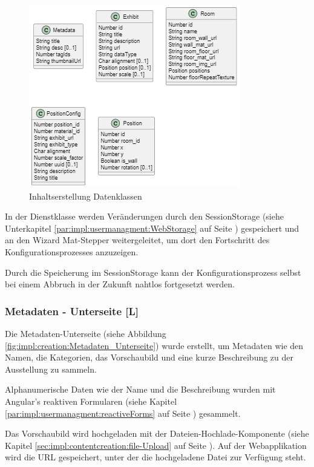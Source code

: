 \begin{figure}
    \centering
    \includegraphics[scale=0.7]{pics/content_creation_classes.png}
    \caption{Inhaltserstellung Datenklassen}
    \label{fig:impl:creation:dataclasses}
\end{figure}

In der Dienstklasse werden Veränderungen durch den SessionStorage (siehe Unterkapitel \ref{par:impl:usermanagment:WebStorage} auf Seite \pageref{par:impl:usermanagment:WebStorage}) gespeichert und an den Wizard Mat-Stepper weitergeleitet, um dort den Fortschritt des Konfigurationsprozesses anzuzeigen.

Durch die Speicherung im SessionStorage kann der Konfigurationsprozess selbst bei einem Abbruch in der Zukunft nahtlos fortgesetzt werden.

\subsubsection{Metadaten - Unterseite [L]}
Die Metadaten-Unterseite (siehe Abbildung \ref{fig:impl:creation:Metadaten_Unterseite}) wurde erstellt, um Metadaten wie den Namen, die Kategorien, das Vorschaubild und eine kurze Beschreibung zu der Ausstellung zu sammeln.

Alphanumerische Daten wie der Name und die Beschreibung wurden mit Angular's reaktiven Formularen (siehe Kapitel \ref{par:impl:usermanagment:reactiveForms} auf Seite \pageref{par:impl:usermanagment:reactiveForms}) gesammelt.

Das Vorschaubild wird hochgeladen mit der Dateien-Hochlade-Komponente (siehe Kapitel \ref{sec:impl:contentcreation:file-Upload} auf Seite \pageref{sec:impl:contentcreation:file-Upload}). Auf der Webapplikation wird die URL gespeichert, unter der die hochgeladene Datei zur Verfügung steht.

